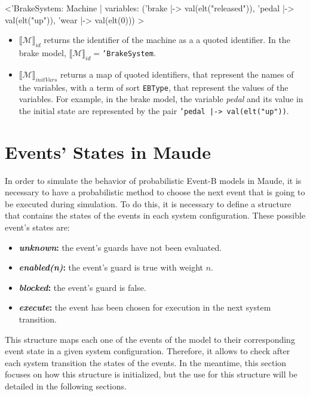 \begin{maude}

<'BrakeSystem: Machine | variables: ('brake |-> val(elt("released")), 
                                     'pedal |-> val(elt("up")), 
                                     'wear |-> val(elt(0))) >
\end{maude}

\begin{itemize}
    \item $\llbracket \mathscr{M} \rrbracket_{id}$ returns the identifier of the machine as a a quoted identifier. In the brake model, $\llbracket \mathscr{M} \rrbracket_{id} = $\texttt{'BrakeSystem}.
    \item $\llbracket \mathscr{M} \rrbracket_{initVars}$ returns a map of quoted identifiers, that represent the names of the variables, with a term of sort \texttt{EBType}, that represent the values of the variables. For example, in the brake model, the variable \textit{pedal} and its value in the initial state are represented by the pair \texttt{'pedal |-> val(elt("up"))}.
\end{itemize}

\section{Events' States in Maude}
In order to simulate the behavior of probabilistic Event-B models in Maude, it is necessary to have a probabilistic method to choose the next event that is going to be executed during simulation. To do this, it is necessary to define a structure that contains the states of the events in each system configuration. These possible event's states are:
\begin{itemize}
    \item \textbf{\textit{unknown}:} the event's guards have not been evaluated.
    \item \textbf{\textit{enabled(n)}:} the event's guard is true with weight $n$.
    \item \textbf{\textit{blocked}:} the event's guard is false.
    \item \textbf{\textit{execute}:} the event has been chosen for execution in the next system transition.
\end{itemize}
This structure maps each one of the events of the model to their corresponding event state in a given system configuration. Therefore, it allows to check after each system transition the states of the events. In the meantime, this section focuses on how this structure is initialized, but the use for this structure will be detailed in the following sections.

